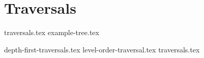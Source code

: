 \documentclass[11pt]{exam}
\begin{document}
\clearpage

\section{Traversals}
{traversals.tex}
{example-tree.tex}
\begin{questions}
{depth-first-traversals.tex}
{level-order-traversal.tex}
{traversals.tex}
\end{questions}
\clearpage
\end{document}
